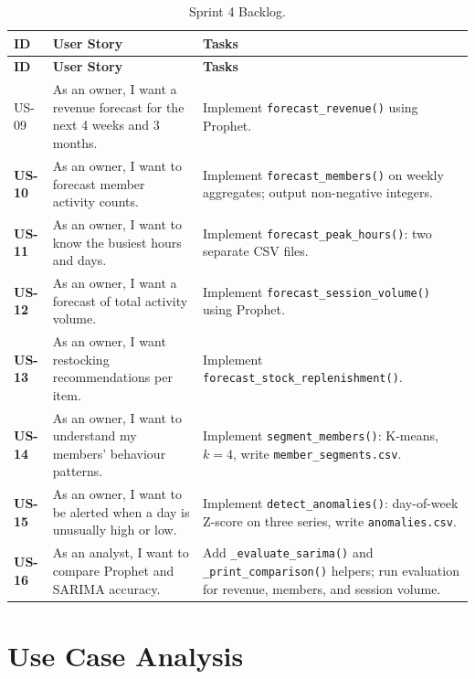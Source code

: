 \documentclass[12pt, a4paper]{report}
\begin{document}
\begin{longtable}{>{\bfseries}p{1.3cm} p{4.0cm} p{7.2cm}}
  \caption{Sprint 4 Backlog.\label{tab:sprint4_backlog}} \\
  \toprule
  \textbf{ID} & \textbf{User Story} & \textbf{Tasks} \\
  \midrule
  \endfirsthead
  \toprule
  \textbf{ID} & \textbf{User Story} & \textbf{Tasks} \\
  \midrule
  \endhead
  \bottomrule
  \endfoot

  US-09 & As an owner, I want a revenue forecast for the next 4 weeks and 3 months.
        & Implement \texttt{forecast\_revenue()} using Prophet. \\[4pt]
  US-10 & As an owner, I want to forecast member activity counts.
        & Implement \texttt{forecast\_members()} on weekly aggregates;
          output non-negative integers. \\[4pt]
  US-11 & As an owner, I want to know the busiest hours and days.
        & Implement \texttt{forecast\_peak\_hours()}: two separate CSV files. \\[4pt]
  US-12 & As an owner, I want a forecast of total activity volume.
        & Implement \texttt{forecast\_session\_volume()} using Prophet. \\[4pt]
  US-13 & As an owner, I want restocking recommendations per item.
        & Implement \texttt{forecast\_stock\_replenishment()}. \\[4pt]
  US-14 & As an owner, I want to understand my members' behaviour patterns.
        & Implement \texttt{segment\_members()}: K-means, $k=4$,
          write \texttt{member\_segments.csv}. \\[4pt]
  US-15 & As an owner, I want to be alerted when a day is unusually high or low.
        & Implement \texttt{detect\_anomalies()}: day-of-week Z-score on three
          series, write \texttt{anomalies.csv}. \\[4pt]
  US-16 & As an analyst, I want to compare Prophet and SARIMA accuracy.
        & Add \texttt{\_evaluate\_sarima()} and \texttt{\_print\_comparison()}
          helpers; run evaluation for revenue, members, and session volume. \\
\end{longtable}

\section{Use Case Analysis}
\end{document}
